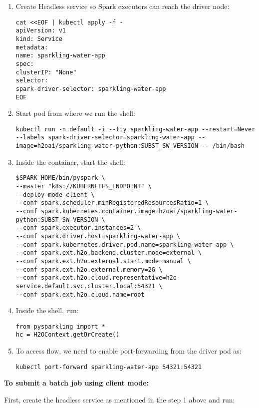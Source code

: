 \begin{enumerate}
    \item Create Headless service so Spark executors can reach the driver node:
    \begin{lstlisting}[style=Bash]
cat <<EOF | kubectl apply -f -
apiVersion: v1
kind: Service
metadata:
name: sparkling-water-app
spec:
clusterIP: "None"
selector:
spark-driver-selector: sparkling-water-app
EOF
    \end{lstlisting}
    \item Start pod from where we run the shell:
    \begin{lstlisting}[style=Bash]
kubectl run -n default -i --tty sparkling-water-app --restart=Never --labels spark-driver-selector=sparkling-water-app --image=h2oai/sparkling-water-python:SUBST_SW_VERSION -- /bin/bash
    \end{lstlisting}
    \item Inside the container, start the shell:
    \begin{lstlisting}[style=Bash]
$SPARK_HOME/bin/pyspark \
--master "k8s://KUBERNETES_ENDPOINT" \
--deploy-mode client \
--conf spark.scheduler.minRegisteredResourcesRatio=1 \
--conf spark.kubernetes.container.image=h2oai/sparkling-water-python:SUBST_SW_VERSION \
--conf spark.executor.instances=2 \
--conf spark.driver.host=sparkling-water-app \
--conf spark.kubernetes.driver.pod.name=sparkling-water-app \
--conf spark.ext.h2o.backend.cluster.mode=external \
--conf spark.ext.h2o.external.start.mode=manual \
--conf spark.ext.h2o.external.memory=2G \
--conf spark.ext.h2o.cloud.representative=h2o-service.default.svc.cluster.local:54321 \
--conf spark.ext.h2o.cloud.name=root
    \end{lstlisting}
    \item Inside the shell, run:
    \begin{lstlisting}[style=Python]
from pysparkling import *
hc = H2OContext.getOrCreate()
    \end{lstlisting}
    \item To access flow, we need to enable port-forwarding from the driver pod as:
    \begin{lstlisting}[style=Bash]
kubectl port-forward sparkling-water-app 54321:54321
    \end{lstlisting}
\end{enumerate}


\textbf{To submit a batch job using client mode:}

First, create the headless service as mentioned in the step 1 above and run:

